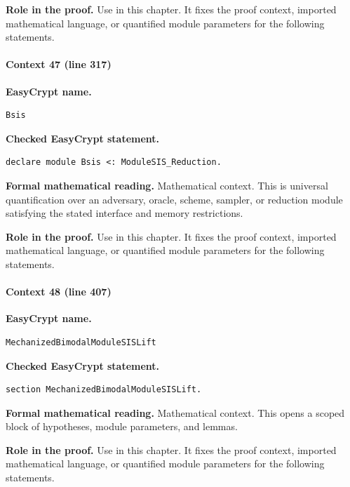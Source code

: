 \noindent\textbf{Role in the proof.}
Use in this chapter. It fixes the proof context, imported mathematical language, or quantified module parameters for the following statements.

\paragraph{Context 47 (line 317)}
\noindent\textbf{EasyCrypt name.}
\begin{lstlisting}[language=EasyCrypt,basicstyle=\ttfamily\scriptsize]
Bsis
\end{lstlisting}
\noindent\textbf{Checked EasyCrypt statement.}
\begin{lstlisting}[language=EasyCrypt,basicstyle=\ttfamily\scriptsize]
declare module Bsis <: ModuleSIS_Reduction.
\end{lstlisting}
\noindent\textbf{Formal mathematical reading.}
Mathematical context. This is universal quantification over an adversary, oracle, scheme, sampler, or reduction module satisfying the stated interface and memory restrictions.

\noindent\textbf{Role in the proof.}
Use in this chapter. It fixes the proof context, imported mathematical language, or quantified module parameters for the following statements.

\paragraph{Context 48 (line 407)}
\noindent\textbf{EasyCrypt name.}
\begin{lstlisting}[language=EasyCrypt,basicstyle=\ttfamily\scriptsize]
MechanizedBimodalModuleSISLift
\end{lstlisting}
\noindent\textbf{Checked EasyCrypt statement.}
\begin{lstlisting}[language=EasyCrypt,basicstyle=\ttfamily\scriptsize]
section MechanizedBimodalModuleSISLift.
\end{lstlisting}
\noindent\textbf{Formal mathematical reading.}
Mathematical context. This opens a scoped block of hypotheses, module parameters, and lemmas.

\noindent\textbf{Role in the proof.}
Use in this chapter. It fixes the proof context, imported mathematical language, or quantified module parameters for the following statements.

